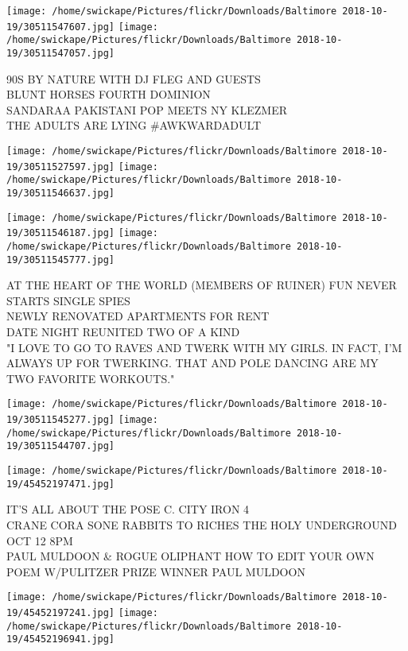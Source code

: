 \documentclass[10pt,letterpaper]{article}
\begin{document}
\texttt{[image: /home/swickape/Pictures/flickr/Downloads/Baltimore 2018-10-19/30511547607.jpg]}
\texttt{[image: /home/swickape/Pictures/flickr/Downloads/Baltimore 2018-10-19/30511547057.jpg]}

90S BY NATURE WITH DJ FLEG AND GUESTS\\
BLUNT HORSES FOURTH DOMINION\\
SANDARAA PAKISTANI POP MEETS NY KLEZMER\\
THE ADULTS ARE LYING \#AWKWARDADULT\\
\pagebreak

\texttt{[image: /home/swickape/Pictures/flickr/Downloads/Baltimore 2018-10-19/30511527597.jpg]}
\texttt{[image: /home/swickape/Pictures/flickr/Downloads/Baltimore 2018-10-19/30511546637.jpg]}

\texttt{[image: /home/swickape/Pictures/flickr/Downloads/Baltimore 2018-10-19/30511546187.jpg]}
\texttt{[image: /home/swickape/Pictures/flickr/Downloads/Baltimore 2018-10-19/30511545777.jpg]}

AT THE HEART OF THE WORLD (MEMBERS OF RUINER) FUN NEVER STARTS SINGLE SPIES\\
NEWLY RENOVATED APARTMENTS FOR RENT\\
DATE NIGHT REUNITED TWO OF A KIND\\
"I LOVE TO GO TO RAVES AND TWERK WITH MY GIRLS.  IN FACT, I'M ALWAYS UP FOR TWERKING.  THAT AND POLE DANCING ARE MY TWO FAVORITE WORKOUTS."\\
\pagebreak

\texttt{[image: /home/swickape/Pictures/flickr/Downloads/Baltimore 2018-10-19/30511545277.jpg]}
\texttt{[image: /home/swickape/Pictures/flickr/Downloads/Baltimore 2018-10-19/30511544707.jpg]}

\vspace{0.25in}
\texttt{[image: /home/swickape/Pictures/flickr/Downloads/Baltimore 2018-10-19/45452197471.jpg]}

IT'S ALL ABOUT THE POSE C. CITY IRON 4\\
CRANE CORA SONE RABBITS TO RICHES THE HOLY UNDERGROUND OCT 12 8PM\\
PAUL MULDOON \& ROGUE OLIPHANT HOW TO EDIT YOUR OWN POEM W/PULITZER PRIZE WINNER PAUL MULDOON\\
\pagebreak

\texttt{[image: /home/swickape/Pictures/flickr/Downloads/Baltimore 2018-10-19/45452197241.jpg]}
\texttt{[image: /home/swickape/Pictures/flickr/Downloads/Baltimore 2018-10-19/45452196941.jpg]}
\end{document}
